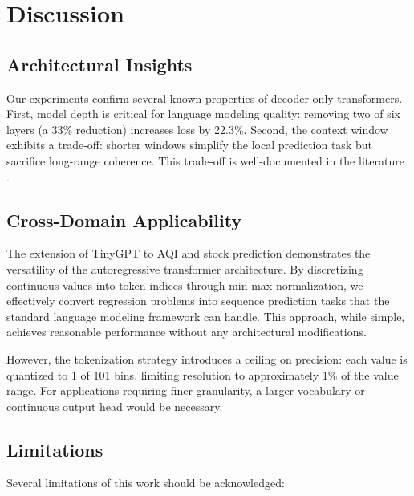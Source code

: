 \documentclass[conference]{IEEEtran}
\begin{document}
\FloatBarrier
\section{Discussion}
\label{sec:discussion}

\subsection{Architectural Insights}

Our experiments confirm several known properties of decoder-only transformers. First, model depth is critical for language modeling quality: removing two of six layers (a 33\% reduction) increases loss by 22.3\%. Second, the context window exhibits a trade-off: shorter windows simplify the local prediction task but sacrifice long-range coherence. This trade-off is well-documented in the literature \cite{dai2019transformerxl, rae2020compressive}.

\subsection{Cross-Domain Applicability}

The extension of TinyGPT to AQI and stock prediction demonstrates the versatility of the autoregressive transformer architecture. By discretizing continuous values into token indices through min-max normalization, we effectively convert regression problems into sequence prediction tasks that the standard language modeling framework can handle. This approach, while simple, achieves reasonable performance without any architectural modifications.

However, the tokenization strategy introduces a ceiling on precision: each value is quantized to 1 of 101 bins, limiting resolution to approximately 1\% of the value range. For applications requiring finer granularity, a larger vocabulary or continuous output head would be necessary.

\subsection{Limitations}

Several limitations of this work should be acknowledged:
\end{document}
